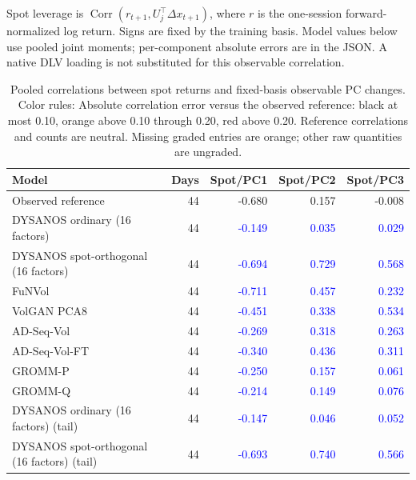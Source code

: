 \documentclass[11pt]{article}
\begin{document}
Spot leverage is $\operatorname{Corr}(r_{t+1},U_j^\top\Delta x_{t+1})$, where $r$ is the one-session forward-normalized log return. Signs are fixed by the training basis. Model values below use pooled joint moments; per-component absolute errors are in the JSON. A native DLV loading is not substituted for this observable correlation.

\begin{table}[H]\centering\small\setlength{\tabcolsep}{4pt}
\caption{Pooled correlations between spot returns and fixed-basis observable PC changes. Color rules: Absolute correlation error versus the observed reference: black at most 0.10, orange above 0.10 through 0.20, red above 0.20. Reference correlations and counts are neutral. Missing graded entries are orange; other raw quantities are ungraded.}\label{tab:spot-leverage}
\begin{tabular}{@{}lrrrr@{}}
\toprule
Model & Days & Spot/PC1 & Spot/PC2 & Spot/PC3 \\
\midrule
Observed reference & 44 & -0.680 & 0.157 & -0.008 \\
DYSANOS ordinary (16 factors) & 44 & \textcolor{blue}{-0.149} & \textcolor{blue}{0.035} & \textcolor{blue}{0.029} \\
DYSANOS spot-orthogonal (16 factors) & 44 & \textcolor{blue}{-0.694} & \textcolor{blue}{0.729} & \textcolor{blue}{0.568} \\
FuNVol & 44 & \textcolor{blue}{-0.711} & \textcolor{blue}{0.457} & \textcolor{blue}{0.232} \\
VolGAN PCA8 & 44 & \textcolor{blue}{-0.451} & \textcolor{blue}{0.338} & \textcolor{blue}{0.534} \\
AD-Seq-Vol & 44 & \textcolor{blue}{-0.269} & \textcolor{blue}{0.318} & \textcolor{blue}{0.263} \\
AD-Seq-Vol-FT & 44 & \textcolor{blue}{-0.340} & \textcolor{blue}{0.436} & \textcolor{blue}{0.311} \\
GROMM-P & 44 & \textcolor{blue}{-0.250} & \textcolor{blue}{0.157} & \textcolor{blue}{0.061} \\
GROMM-Q & 44 & \textcolor{blue}{-0.214} & \textcolor{blue}{0.149} & \textcolor{blue}{0.076} \\
DYSANOS ordinary (16 factors) (tail) & 44 & \textcolor{blue}{-0.147} & \textcolor{blue}{0.046} & \textcolor{blue}{0.052} \\
DYSANOS spot-orthogonal (16 factors) (tail) & 44 & \textcolor{blue}{-0.693} & \textcolor{blue}{0.740} & \textcolor{blue}{0.566} \\
\bottomrule\end{tabular}\end{table}
\end{document}
